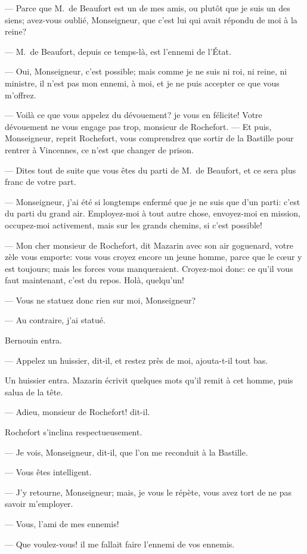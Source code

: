 — Parce que M.~de Beaufort est un de mes amis, ou plutôt que je suis un des siens; avez-vous oublié, Monseigneur, que c'est lui qui avait répondu de moi à la reine?

— M.~de Beaufort, depuis ce temps-là, est l'ennemi de l'État.

— Oui, Monseigneur, c'est possible; mais comme je ne suis ni roi, ni reine, ni ministre, il n'est pas mon ennemi, à moi, et je ne puis accepter ce que vous m'offrez.

— Voilà ce que vous appelez du dévouement? je vous en félicite! Votre dévouement ne vous engage pas trop, monsieur de Rochefort.
— Et puis, Monseigneur, reprit Rochefort, vous comprendrez que sortir de la Bastille pour rentrer à Vincennes, ce n'est que changer de prison.

— Dites tout de suite que vous êtes du parti de M.~de Beaufort, et ce sera plus franc de votre part.

— Monseigneur, j'ai été si longtemps enfermé que je ne suis que d'un parti: c'est du parti du grand air. Employez-moi à tout autre chose, envoyez-moi en mission, occupez-moi activement, mais sur les grands chemins, si c'est possible!

— Mon cher monsieur de Rochefort, dit Mazarin avec son air goguenard, votre zèle vous emporte: vous vous croyez encore un jeune homme, parce que le cœur y est toujours; mais les forces vous manqueraient. Croyez-moi donc: ce qu'il vous faut maintenant, c'est du repos. Holà, quelqu'un!

— Vous ne statuez donc rien sur moi, Monseigneur?

— Au contraire, j'ai statué.

Bernouin entra.

— Appelez un huissier, dit-il, et restez près de moi, ajouta-t-il tout bas.

Un huissier entra. Mazarin écrivit quelques mots qu'il remit à cet homme, puis salua de la tête.

— Adieu, monsieur de Rochefort! dit-il.

Rochefort s'inclina respectueusement.

— Je vois, Monseigneur, dit-il, que l'on me reconduit à la Bastille.

— Vous êtes intelligent.

— J'y retourne, Monseigneur; mais, je vous le répète, vous avez tort de ne pas savoir m'employer.

— Vous, l'ami de mes ennemis!

— Que voulez-vous! il me fallait faire l'ennemi de vos ennemis.

